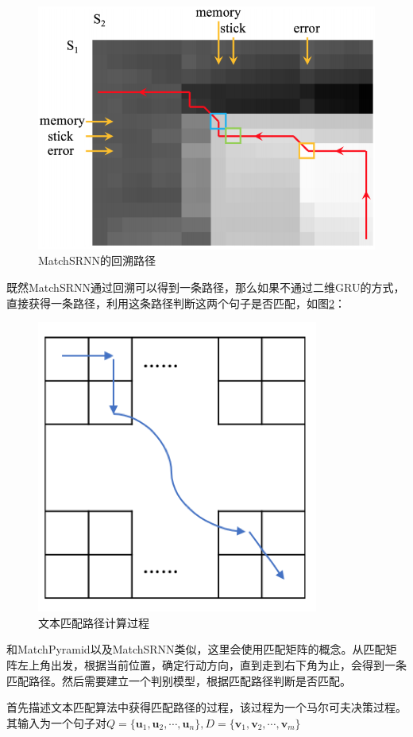 \begin{figure}[!htbp]\centering
\vspace{1em}
  \includegraphics[width=0.6\linewidth]{figures/LD_dis}
  \caption{MatchSRNN的回溯路径} 
  \label{fig:LD_dis}       %
  \vspace{1em}
\end{figure}

既然MatchSRNN通过回溯可以得到一条路径，那么如果不通过二维GRU的方式，直接获得一条路径，利用这条路径判断这两个句子是否匹配，如图\ref{fig:match_MDP}：

\begin{figure}[!htbp]\centering
\vspace{1em}
  \includegraphics[width=0.5\linewidth]{figures/match_MDP}
  \caption{文本匹配路径计算过程} 
  \label{fig:match_MDP}       %
  \vspace{1em}
\end{figure}

和MatchPyramid以及MatchSRNN类似，这里会使用匹配矩阵的概念。从匹配矩阵左上角出发，根据当前位置，确定行动方向，直到走到右下角为止，会得到一条匹配路径。然后需要建立一个判别模型，根据匹配路径判断是否匹配。

首先描述文本匹配算法中获得匹配路径的过程，该过程为一个马尔可夫决策过程。其输入为一个句子对$Q=\{\mathbf{u}_1, \mathbf{u}_2,\cdots,\mathbf{u}_n\}, D=\{\mathbf{v}_1, \mathbf{v}_2,\cdots,\mathbf{v}_m\}$

